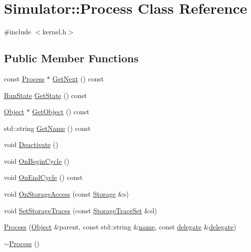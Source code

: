 \hypertarget{class_simulator_1_1_process}{\section{Simulator\+:\+:Process Class Reference}
\label{class_simulator_1_1_process}
}


{\ttfamily \#include $<$kernel.\+h$>$}

\subsection*{Public Member Functions}
\begin{DoxyCompactItemize}
\item 
const \hyperlink{class_simulator_1_1_process}{Process} $\ast$ \hyperlink{class_simulator_1_1_process_a45e0d809a62e75161a4f319851eefe49}{Get\+Next} () const 
\item 
\hyperlink{namespace_simulator_a7b6594cd8ea507163ee6e4d4db4ddad5}{Run\+State} \hyperlink{class_simulator_1_1_process_ae6b3e8d40654ac8edbce88b64d44f925}{Get\+State} () const 
\item 
\hyperlink{class_simulator_1_1_object}{Object} $\ast$ \hyperlink{class_simulator_1_1_process_a1fbf0e399a433e98654e2d1b355afec4}{Get\+Object} () const 
\item 
std\+::string \hyperlink{class_simulator_1_1_process_a651e8a8cedc9a13f2667524325640c02}{Get\+Name} () const 
\item 
void \hyperlink{class_simulator_1_1_process_a81fa6b864242ca842cc64b2485786783}{Deactivate} ()
\item 
void \hyperlink{class_simulator_1_1_process_abe655e0c742cc6527b9a4b408ad2f853}{On\+Begin\+Cycle} ()
\item 
void \hyperlink{class_simulator_1_1_process_ae33929cc5e8e74c48b7f9c4ca09ae788}{On\+End\+Cycle} () const 
\item 
void \hyperlink{class_simulator_1_1_process_a31220f92e88beb3b885eb4cf51cb773e}{On\+Storage\+Access} (const \hyperlink{class_simulator_1_1_storage}{Storage} \&s)
\item 
void \hyperlink{class_simulator_1_1_process_ac7671a8abab60b3361cf8fe5eb4b47f8}{Set\+Storage\+Traces} (const \hyperlink{class_simulator_1_1_storage_trace_set}{Storage\+Trace\+Set} \&sl)
\item 
\hyperlink{class_simulator_1_1_process_aa2cfb7f220ee42879275381c43fedb31}{Process} (\hyperlink{class_simulator_1_1_object}{Object} \&parent, const std\+::string \&\hyperlink{mtconf_8c_a8f8f80d37794cde9472343e4487ba3eb}{name}, const \hyperlink{class_simulator_1_1delegate}{delegate} \&\hyperlink{class_simulator_1_1delegate}{delegate})
\item 
\hyperlink{class_simulator_1_1_process_a08128f1be2125793487e29bf747541a9}{$\sim$\+Process} ()
\end{DoxyCompactItemize}
